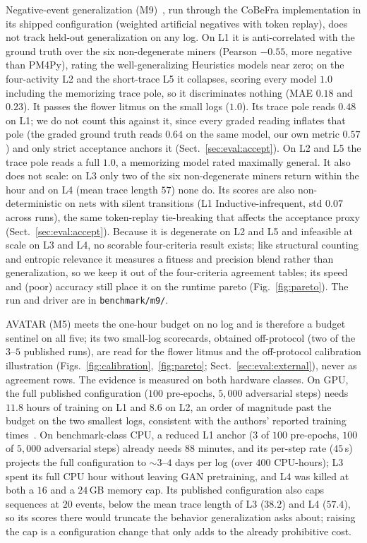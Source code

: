 \documentclass[runningheads]{llncs}
\newcommand{\chg}[1]{#1}
\begin{document}
\chg{Negative-event generalization (M9)~\cite{vandenbroucke2014negative}, run through the CoBeFra implementation in its shipped configuration (weighted artificial negatives with token replay), does not track held-out generalization on any log. On L1 it is anti-correlated with the ground truth over the six non-degenerate miners (Pearson $-0.55$, more negative than PM4Py), rating the well-generalizing Heuristics models near zero; on the four-activity L2 and the short-trace L5 it collapses, scoring every model $1.0$ including the memorizing trace pole, so it discriminates nothing (MAE $0.18$ and $0.23$). It passes the flower litmus on the small logs ($1.0$). Its trace pole reads $0.48$ on L1; we do not count this against it, since every graded reading inflates that pole (the graded ground truth reads $0.64$ on the same model, our own metric $0.57$) and only strict acceptance anchors it (Sect.~\ref{sec:eval:accept}). On L2 and L5 the trace pole reads a full $1.0$, a memorizing model rated maximally general. It also does not scale: on L3 only two of the six non-degenerate miners return within the hour and on L4 (mean trace length $57$) none do. Its scores are also non-deterministic on nets with silent transitions (L1 Inductive-infrequent, std $0.07$ across runs), the same token-replay tie-breaking that affects the acceptance proxy (Sect.~\ref{sec:eval:accept}). Because it is degenerate on L2 and L5 and infeasible at scale on L3 and L4, no scorable four-criteria result exists; like structural counting and entropic relevance it measures a fitness and precision blend rather than generalization, so we keep it out of the four-criteria agreement tables; its speed and (poor) accuracy still place it on the runtime pareto (Fig.~\ref{fig:pareto}). The run and driver are in \texttt{benchmark/m9/}.}

\chg{AVATAR (M5) meets the one-hour budget on no log and is therefore a budget sentinel on all five; its two small-log scorecards, obtained off-protocol (two of the $3$--$5$ published runs), are read for the flower litmus and the off-protocol calibration illustration (Figs.~\ref{fig:calibration},~\ref{fig:pareto}; Sect.~\ref{sec:eval:external}), never as agreement rows. The evidence is measured on both hardware classes. On GPU, the full published configuration ($100$ pre-epochs, $5{,}000$ adversarial steps) needs $11.8$ hours of training on L1 and $8.6$ on L2, an order of magnitude past the budget on the two smallest logs, consistent with the authors' reported training times~\cite{theis2020avatar}. On benchmark-class CPU, a reduced L1 anchor ($3$ of $100$ pre-epochs, $100$ of $5{,}000$ adversarial steps) already needs $88$ minutes, and its per-step rate ($45$\,s) projects the full configuration to ${\sim}3$--$4$ days per log (over $400$ CPU-hours); L3 spent its full CPU hour without leaving GAN pretraining, and L4 was killed at both a $16$ and a $24$\,GB memory cap. Its published configuration also caps sequences at $20$ events, below the mean trace length of L3 ($38.2$) and L4 ($57.4$), so its scores there would truncate the behavior generalization asks about; raising the cap is a configuration change that only adds to the already prohibitive cost.}
\end{document}
